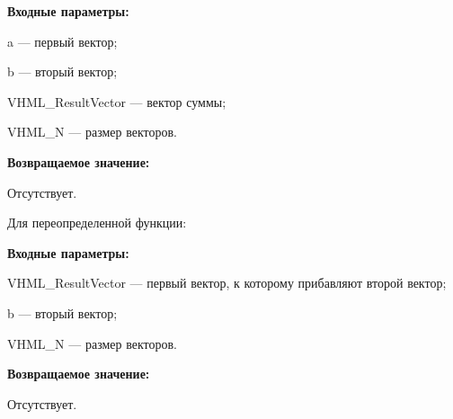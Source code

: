 \textbf{Входные параметры:}

  a --- первый вектор;
  
 b --- вторый вектор;
 
 VHML\_ResultVector --- вектор суммы;
 
 VHML\_N --- размер векторов.

\textbf{Возвращаемое значение:}

Отсутствует.

Для переопределенной функции:

\textbf{Входные параметры:}

 VHML\_ResultVector --- первый вектор, к которому прибавляют второй вектор;
  
 b --- вторый вектор;
 
 VHML\_N --- размер векторов.

\textbf{Возвращаемое значение:}

Отсутствует.